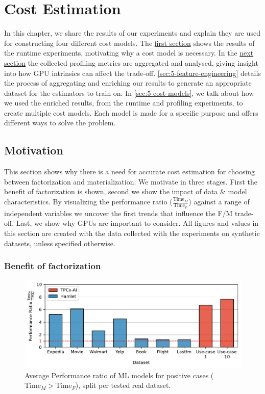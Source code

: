
\chapter{Cost Estimation}

\label{chapter:cost-estimation}
In this chapter, we share the results of our experiments and explain they are used for constructing four different cost models. The \hyperref[sec:5-motivation]{first section} shows the results of the runtime experiments, motivating why a cost model is necessary. In the \hyperref[sec:5-gpu-performance-analysis]{next section} the collected profiling metrics are aggregated and analysed, giving insight into how GPU intrinsics can affect the trade-off. \autoref{sec:5-feature-engineering} details the process of aggregating and enriching our results to generate an appropriate dataset for the estimators to train on. In \autoref{sec:5-cost-models}, we talk about how we used the enriched results, from the runtime and profiling experiments, to create multiple cost models. Each model is made for a specific purpose and offers different ways to solve the problem.

\section{Motivation}
\label{sec:5-motivation}
This section shows why there is a need for accurate cost estimation for choosing between factorization and materialization. We motivate in three stages. First the benefit of factorization is shown, second we show the impact of data \& model characteristics. By visualizing the performance ratio ($\frac{\text{Time}_M}{\text{Time}_F}$) against a range of independent variables we uncover the first trends that influence the F/M trade-off. Last, we show why GPUs are important  to consider. All figures and values in this section are created with the data collected with the experiments on synthetic datasets, unless specified otherwise.

\subsection{Benefit of factorization}
\begin{figure}[ht]
    \centering
    \includegraphics[width=0.7\linewidth]{chapters/05_cost_estimation/figures/real_datasets_speedup.pdf}
    \vspace*{-5mm}
    \caption[Performance gain with factorization on real datasets]{Average Performance ratio of ML models for positive cases ($\text{Time}_M > \text{Time}_F$), split per tested real dataset.}
    \label{fig:5-real-perf-ratio}
\end{figure}

